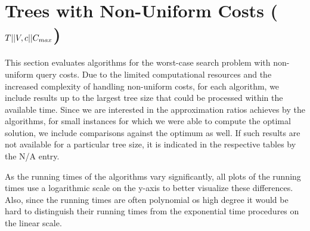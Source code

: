 \clearpage
\section{Trees with Non-Uniform Costs ($T || V, c || C_{max}$)}

This section evaluates algorithms for the worst-case search problem with non-uniform query costs. Due to the limited computational resources and the increased complexity of handling non-uniform costs, for each algorithm, we include results up to the largest tree size that could be processed within the available time. Since we are interested in the approximation ratios achieves by the algorithms, for small instances for which we were able to compute the optimal solution, we include comparisons against the optimum as well. If such results are not available for a particular tree size, it is indicated in the respective tables by the N/A entry.

As the running times of the algorithms vary significantly, all plots of the running times use a logarithmic scale on the y-axis to better visualize these differences. Also, since the running times are often polynomial os high degree it would be hard to distinguish their running times from the exponential time procedures on the linear scale.













